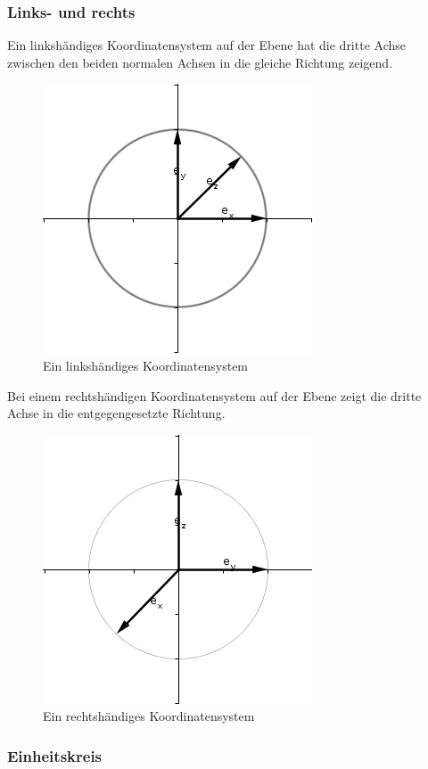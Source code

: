 \documentclass[a4paper]{article}
\begin{document}
\subsubsection{Links- und rechts}
Ein linksh\"andiges Koordinatensystem auf der Ebene hat die dritte Achse zwischen den beiden normalen Achsen in die gleiche Richtung zeigend.

\begin{figure}
\caption{Ein linksh\"andiges Koordinatensystem}
\includegraphics[scale=0.5]{lefthand45.png}
\end{figure}

Bei einem rechtsh\"andigen Koordinatensystem auf der Ebene zeigt die dritte Achse in die entgegengesetzte Richtung.

\begin{figure}
\caption{Ein rechtsh\"andiges Koordinatensystem}
\includegraphics[scale=0.5]{righthand45.png}
\end{figure}

\subsubsection{Einheitskreis}
\end{document}
